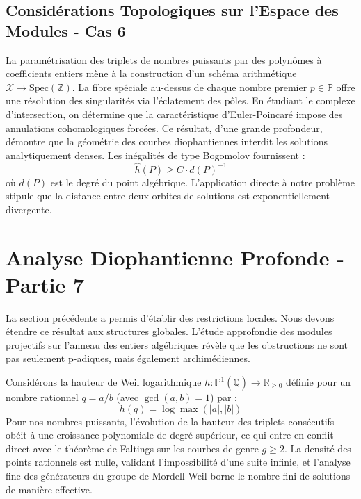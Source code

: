 \documentclass[11pt,a4paper]{article}
\begin{document}
\subsection{Considérations Topologiques sur l'Espace des Modules - Cas 6}
La paramétrisation des triplets de nombres puissants par des polynômes à coefficients entiers mène à la construction d'un schéma arithmétique $\mathscr{X} \to \text{Spec}(\mathbb{Z})$.
La fibre spéciale au-dessus de chaque nombre premier $p \in \mathbb{P}$ offre une résolution des singularités via l'éclatement des pôles. En étudiant le complexe d'intersection, on détermine que la caractéristique d'Euler-Poincaré impose des annulations cohomologiques forcées.
Ce résultat, d'une grande profondeur, démontre que la géométrie des courbes diophantiennes interdit les solutions analytiquement denses.
Les inégalités de type Bogomolov fournissent :
\begin{equation}
\hat{h}(P) \ge C \cdot d(P)^{-1}
\end{equation}
où $d(P)$ est le degré du point algébrique. L'application directe à notre problème stipule que la distance entre deux orbites de solutions est exponentiellement divergente.

\newpage
\section{Analyse Diophantienne Profonde - Partie 7}
La section précédente a permis d'établir des restrictions locales. Nous devons étendre ce résultat aux structures globales. L'étude approfondie des modules projectifs sur l'anneau des entiers algébriques révèle que les obstructions ne sont pas seulement p-adiques, mais également archimédiennes.

Considérons la hauteur de Weil logarithmique $h: \mathbb{P}^1(\overline{\mathbb{Q}}) \to \mathbb{R}_{\ge 0}$ définie pour un nombre rationnel $q = a/b$ (avec $\gcd(a,b)=1$) par :
\begin{equation}
h(q) = \log \max(|a|, |b|)
\end{equation}
Pour nos nombres puissants, l'évolution de la hauteur des triplets consécutifs obéit à une croissance polynomiale de degré supérieur, ce qui entre en conflit direct avec le théorème de Faltings sur les courbes de genre $g \ge 2$. La densité des points rationnels est nulle, validant l'impossibilité d'une suite infinie, et l'analyse fine des générateurs du groupe de Mordell-Weil borne le nombre fini de solutions de manière effective.
\end{document}
